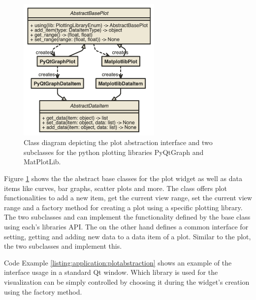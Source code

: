 \begin{figure}[h]
    \centering
    \includegraphics[width=7cm]{resources/img/class/plotabstraction}
    \caption{
        Class diagram depicting the plot abstraction interface and two
        subclasses for the python plotting libraries PyQtGraph and MatPlotLib. 
    }
    \label{fig:application:design:classdiagram:plot}
\end{figure}

Figure \ref{fig:application:design:classdiagram:plot} shows the the abstract
base classes for the plot widget as well as data items like curves, bar graphs,
scatter plots and more. The class  offers
plot functionalities to add a new item, get the current view range, set the
current view range and a factory method for creating a plot using a specific
plotting library. The two subclasses  and
 can implement the functionality defined by
the base class using each's libraries API. The
 on the other hand defines a common
interface for setting, getting and adding new data to a data item of a plot.
Similar to the plot, the two subclasses 
and  implement this.

Code Example \ref{listing:application:plotabstraction} shows an example of the
interface usage in a standard Qt window. Which library is used for the
visualization can be simply controlled by choosing it during the widget's
creation using the  factory method.




